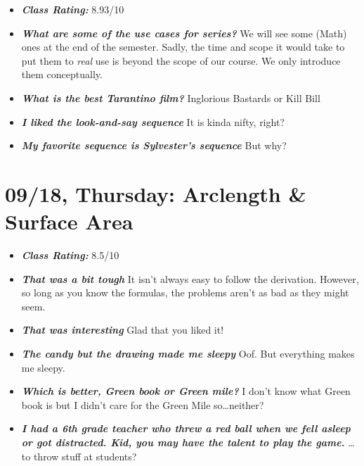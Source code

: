 \documentclass[11pt,letterpaper]{article}
\begin{document}
\begin{itemize}
\item {\bfseries\itshape Class Rating:} 8.93/10

\item {\bfseries\itshape What are some of the use cases for series?} We will see some (Math) ones at the end of the semester. Sadly, the time and scope it would take to put them to \textit{real} use is beyond the scope of our course. We only introduce them conceptually. 

\item {\bfseries\itshape What is the best Tarantino film?} Inglorious Bastards or Kill Bill

\item {\bfseries\itshape I liked the look-and-say sequence} It is kinda nifty, right?

\item {\bfseries\itshape My favorite sequence is Sylvester's sequence} But why?
\end{itemize}

\newpage
\section*{09/18, Thursday: Arclength \& Surface Area\label{09-18}}

\begin{itemize}
\item {\bfseries\itshape Class Rating:} 8.5/10

\item {\bfseries\itshape That was a bit tough} It isn't always easy to follow the derivation. However, so long as you know the formulas, the problems aren't as bad as they might seem.

\item {\bfseries\itshape That was interesting} Glad that you liked it!

\item {\bfseries\itshape The candy but the drawing made me sleepy} Oof. But everything makes me sleepy.

\item {\bfseries\itshape Which is better, Green book or Green mile?} I don't know what Green book is but I didn't care for the Green Mile so\dots neither?

\item {\bfseries\itshape I had a 6th grade teacher who threw a red ball when we fell asleep or got distracted. Kid, you may have the talent to play the game.} \dots to throw stuff at students?
\end{itemize}
\end{document}
